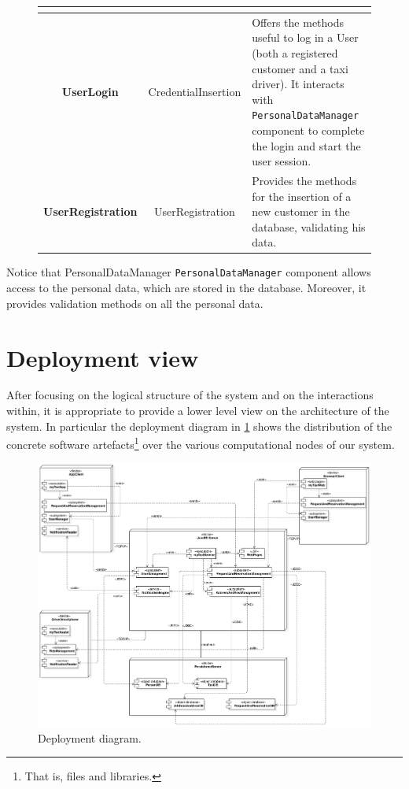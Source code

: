 \clearpage
\begin{figure}\begin{tabularx}{\textwidth}{ >{\bfseries}c C{\iW} X }\toprule
{} &  & %
\\%
\toprule%
%	
	UserLogin%
	&%
	CredentialInsertion%
	&%
	Offers the methods useful to log in a User (both a registered customer and a taxi driver). It interacts with \texttt{Per\-son\-al\-Data\-Man\-ager} component to complete the login and start the user session.%
%	
\\%
\midrule%
%	
	UserRegistration%
	&%
	UserRegistration%
	&%
	Provides the methods for the insertion of a new customer in the database, validating his data.%
%	
\\%
\bottomrule%
\end{tabularx}%
\end{figure}

Notice that PersonalDataManager \texttt{Per\-son\-al\-Data\-Man\-ager} component allows access to the personal data, which are stored in the database. Moreover, it provides validation methods on all the personal data.


\section{Deployment view}\label{sec:deployment}
After focusing on the logical structure of the system and on the interactions within, it is appropriate to provide a lower level view on the architecture of the system. In particular the deployment diagram in \cref{fig:deployment} shows the distribution of the concrete software artefacts\footnote{That is, files and libraries.} over the various computational nodes of our system.

\begin{figure}%
	\centering%
	\includegraphics[width=\textwidth]{img/Deploy__DeploymentDiagram_4}%
	\caption{Deployment diagram.}\label{fig:deployment}%
\end{figure}

